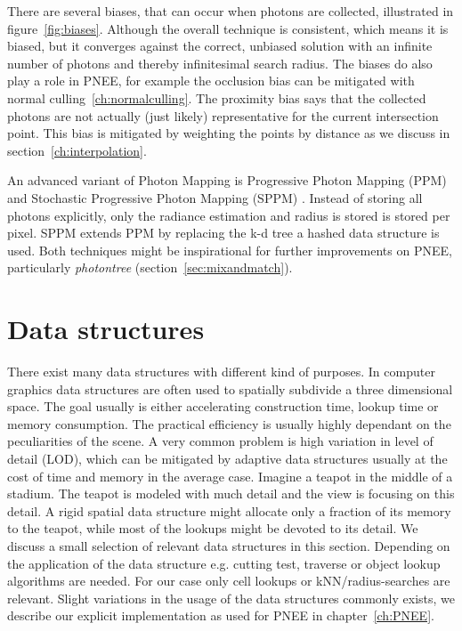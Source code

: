 There are several biases, that can occur when photons are collected, illustrated in figure~\ref{fig:biases}. Although the overall technique is consistent, which means it is biased, but it converges against the correct, unbiased solution with an infinite number of photons and thereby infinitesimal search radius. The biases do also play a role in PNEE, for example the occlusion bias can be mitigated with normal culling~\ref{ch:normalculling}. The proximity bias says that the collected photons are not actually (just likely) representative for the current intersection point. This bias is mitigated by weighting the points by distance as we discuss in section~\ref{ch:interpolation}. 

An advanced variant of Photon Mapping is Progressive Photon Mapping (PPM) \parencite{DBLP:journals/tog/HachisukaOJ08} and Stochastic Progressive Photon Mapping (SPPM) \parencite{DBLP:journals/tog/HachisukaJ09}. Instead of storing all photons explicitly, only the radiance estimation and radius is stored is stored per pixel. SPPM extends PPM by replacing the k-d tree a hashed data structure is used. Both techniques might be inspirational for further improvements on PNEE, particularly \textit{photontree} (section~\ref{sec:mixandmatch}).

\section{Data structures}

There exist many data structures with different kind of purposes. In computer graphics data structures are often used to spatially subdivide a three dimensional space. The goal usually is either accelerating construction time, lookup time or memory consumption. The practical efficiency is usually highly dependant on the peculiarities of the scene. A very common problem is high variation in level of detail (LOD), which can be mitigated by adaptive data structures usually at the cost of time and memory in the average case. Imagine a teapot in the middle of a stadium. The teapot is modeled with much detail and the view is focusing on this detail. A rigid spatial data structure might allocate only a fraction of its memory to the teapot, while most of the lookups might be devoted to its detail. We discuss a small selection of relevant data structures in this section. Depending on the application of the data structure e.g. cutting test, traverse or object lookup algorithms are needed. For our case only cell lookups or kNN/radius-searches are relevant. Slight variations in the usage of the data structures commonly exists, we describe our explicit implementation as used for PNEE in chapter~\ref{ch:PNEE}.

